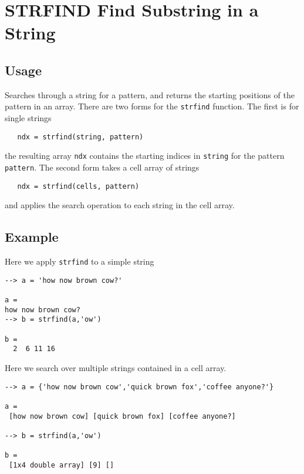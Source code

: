 \section{STRFIND Find Substring in a String}

\subsection{Usage}

Searches through a string for a pattern, and returns the starting
positions of the pattern in an array.  There are two forms for 
the \verb|strfind| function.  The first is for single strings
\begin{verbatim}
   ndx = strfind(string, pattern)
\end{verbatim}
the resulting array \verb|ndx| contains the starting indices in \verb|string|
for the pattern \verb|pattern|.  The second form takes a cell array of 
strings
\begin{verbatim}
   ndx = strfind(cells, pattern)
\end{verbatim}
and applies the search operation to each string in the cell array.
\subsection{Example}

Here we apply \verb|strfind| to a simple string
\begin{verbatim}
--> a = 'how now brown cow?'

a = 
how now brown cow?
--> b = strfind(a,'ow')

b = 
  2  6 11 16 
\end{verbatim}
Here we search over multiple strings contained in a cell array.
\begin{verbatim}
--> a = {'how now brown cow','quick brown fox','coffee anyone?'}

a = 
 [how now brown cow] [quick brown fox] [coffee anyone?] 

--> b = strfind(a,'ow')

b = 
 [1x4 double array] [9] [] 
\end{verbatim}
